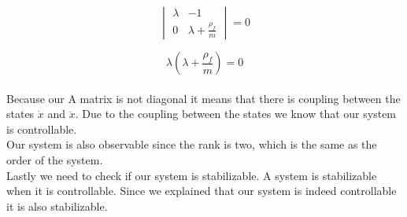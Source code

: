 \documentclass[final]{scrreprt} %
\begin{document}
\begin{enumerate}
\begin{equation}
	\begin{vmatrix}
		\lambda & -1 \\
		0 & \lambda + \frac{\rho_f}{m}
	\end{vmatrix} = 0
	\label{eq:fmatrix}
\end{equation}

\begin{equation}
	\lambda(\lambda + \frac{\rho_f}{m}) = 0
	\label{eq:characteristic}
\end{equation}
\\
Because our A matrix is not diagonal it means that there is coupling between the states $\dot{x}$ and $\ddot{x}$. Due to the coupling between the states we know that our system is controllable.\\
Our system is also observable since the rank is two, which is the same as the order of the system.\\
Lastly we need to check if our system is stabilizable. A system is stabilizable when it is controllable. Since we explained that our system is indeed controllable it is also stabilizable.



\end{enumerate}
\end{document}
